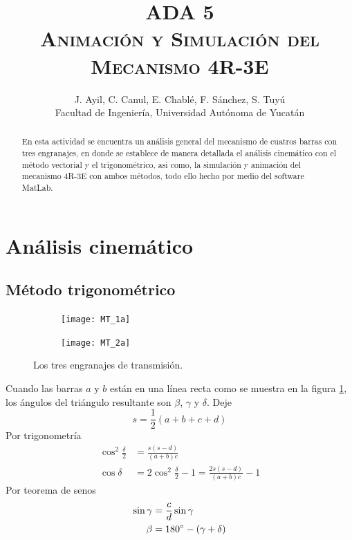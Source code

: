\documentclass[12pt, final]{extarticle}
\title{ADA 5\\
\textsc{Animación y Simulación del Mecanismo 4R-3E}}
\author{J. Ayil, C. Canul, E. Chablé, F. Sánchez, S. Tuyú\\
{Facultad de Ingeniería, Universidad Autónoma de Yucatán}}
\date{}
\begin{document}
\maketitle

\begin{abstract}
   En esta actividad se encuentra un análisis general del mecanismo de cuatros barras con tres engranajes, en donde se establece de manera detallada el análisis cinemático con el método vectorial y el trigonométrico, asi como, la simulación y animación del mecanismo 4R-3E con ambos métodos, todo ello hecho por medio del software MatLab. 
\end{abstract}

\section{Análisis cinemático}
\subsection{Método trigonométrico}
\begin{figure}[ht]
    \centering
    \begin{subfigure}[b]{0.45\textwidth}
        \centering
        \texttt{[image: MT\_1a]}
        \caption{}
        \label{Fig: Los tres engranajes de transmision a}
    \end{subfigure}
    \hfill
    \begin{subfigure}[b]{0.45\textwidth}
        \centering
        \texttt{[image: MT\_2a]}
        \caption{}
        \label{Fig: Los tres engranajes de transmision b}
    \end{subfigure}
    \caption{Los tres engranajes de transmisión.}
    \label{Fig: Los tres engranajes de transmision}
\end{figure}

Cuando las barras $a$ y $b$ están en una línea recta como se muestra en la
figura \ref{Fig: Los tres engranajes de transmision a}, los ángulos del
triángulo resultante son $\beta$, $\gamma$ y $\delta$. Deje
\begin{equation}
    s = \frac{1}{2}(a + b + c + d)
\end{equation}
Por trigonometría
\begin{align}
    \cos^2 \frac{\delta}{2} &= \frac{s(s - d)}{(a + b)c} \\
    \cos \delta &= 2\cos^2 \frac{\delta}{2} - 1 = \frac{2s(s - d)}{(a + b)c} - 1
\end{align}
Por teorema de senos
\begin{align}
    \sin \gamma &= \frac{c}{d}\sin\gamma \\
    \beta &= 180\degree - (\gamma + \delta)
\end{align}
\end{document}

